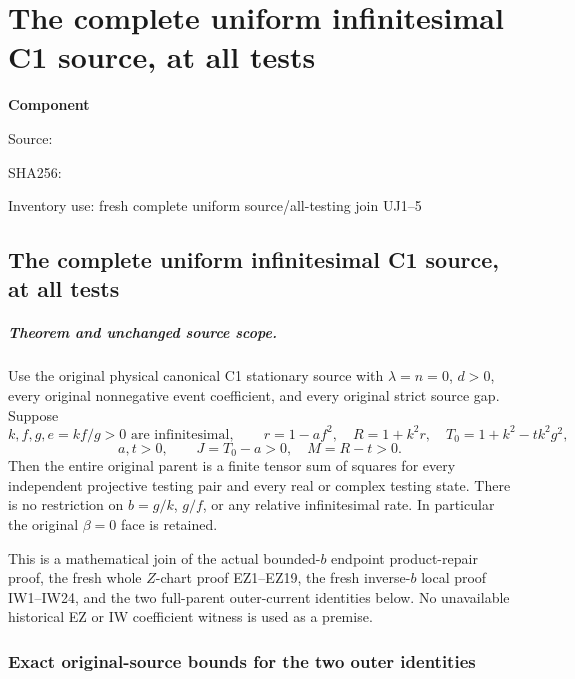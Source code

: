 \chapter{The complete uniform infinitesimal C1 source, at all tests}
\label{component:p845b3cb8b114}
\noindent\textbf{Component }\par
{\small\noindent Source: \par}
{\small\noindent SHA256: \par}
{\small\noindent Inventory use: fresh complete uniform source/all-testing join UJ1--5\par}
\medskip
\section{The complete uniform infinitesimal C1 source, at all tests}
\label{p845b3cb8b114:sec:uniform-c1-complete-current-join}

\paragraph{Theorem and unchanged source scope.}
Use the original physical canonical C1 stationary source with
$\lambda=n=0$, $d>0$, every original nonnegative event coefficient,
and every original strict source gap. Suppose
\[
 k,f,g,e=kf/g>0\text{ are infinitesimal},\qquad
 r=1-af^2,\quad R=1+k^2r,\quad T_0=1+k^2-tk^2g^2,
\]
\[
                         a,t>0,\qquad J=T_0-a>0,\quad M=R-t>0.
                                                               \tag{UJ1}
\]
Then the entire original parent is a finite tensor sum of squares
for every independent projective testing pair and every real or
complex testing state. There is no restriction on $b=g/k$, $g/f$,
or any relative infinitesimal rate. In particular the original
$\beta=0$ face is retained.

This is a mathematical join of the actual bounded-$b$ endpoint
product-repair proof, the fresh whole $Z$-chart proof EZ1--EZ19,
the fresh inverse-$b$ local proof IW1--IW24, and the two full-parent
outer-current identities below. No unavailable historical EZ or IW
coefficient witness is used as a premise.

\subsection{Exact original-source bounds for the two outer identities}

